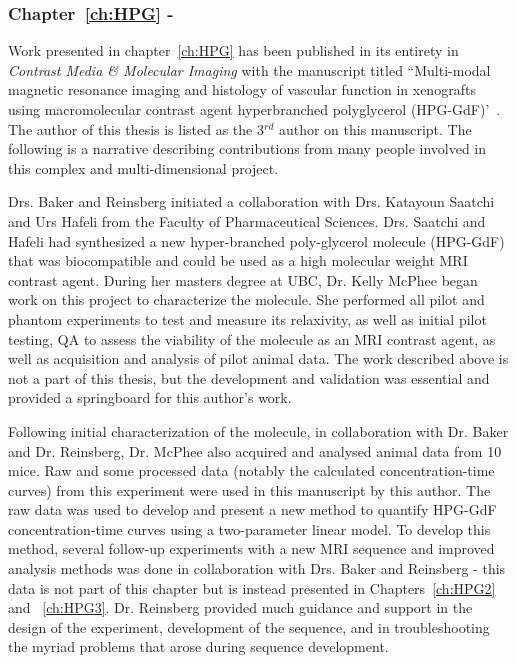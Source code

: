 \subsubsection{Chapter~\ref{ch:HPG} - }

Work presented in chapter~\ref{ch:HPG} has been published in its entirety in \emph{Contrast Media \& Molecular Imaging} with the manuscript titled ``Multi-modal magnetic resonance imaging and histology of vascular function in xenografts using macromolecular contrast agent hyperbranched polyglycerol (\acs{HPG-GdF})'~\cite{Baker:2015cob}.
The author of this thesis is listed as the 3$^{rd}$ author on this manuscript.
The following is a narrative describing contributions from many people involved in this complex and multi-dimensional project.

Drs. Baker and Reinsberg initiated a collaboration with Drs. Katayoun Saatchi and Urs Hafeli from the Faculty of Pharmaceutical Sciences.
Drs. Saatchi and Hafeli had synthesized a new hyper-branched poly-glycerol molecule (\acs{HPG-GdF}) that was biocompatible and could be used as a high molecular weight MRI contrast agent.
During her masters degree at UBC, Dr. Kelly McPhee began work on this project to characterize the molecule. 
She performed all pilot and phantom experiments to test and measure its relaxivity, as well as initial pilot testing, QA to assess the viability of the molecule as an MRI contrast agent, as well as acquisition and analysis of pilot animal data.
The work described above is not a part of this thesis, but the development and validation was essential and provided a springboard for this author's work.

Following initial characterization of the molecule, in collaboration with Dr. Baker and Dr. Reinsberg, Dr. McPhee also acquired and analysed animal data from 10 mice. 
Raw and some processed data (notably the calculated concentration-time curves) from this experiment were used in this manuscript by this author.
The raw data was used to develop and present a new method to quantify \acs{HPG-GdF} concentration-time curves using a two-parameter linear model.
To develop this method, several follow-up experiments with a new MRI sequence and improved analysis methods was done in collaboration with Drs. Baker and Reinsberg - this data is not part of this chapter but is instead presented in Chapters~\ref{ch:HPG2} and ~\ref{ch:HPG3}.
Dr. Reinsberg provided much guidance and support in the design of the experiment, development of the sequence, and in troubleshooting the myriad problems that arose during sequence development.

